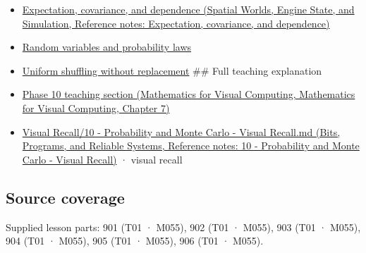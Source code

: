 \begin{itemize}
\item
  \href{../05-Spatial-Worlds-Engine-State-and-Simulation/main.pdf\#nameddest=appendix-54c383df9992}{Expectation, covariance, and dependence (Spatial Worlds, Engine State, and Simulation, Reference notes: Expectation, covariance, and dependence)}
\item
  \hyperref[appendix-4d0203f7944f]{Random variables and probability laws}
\item
  \hyperref[appendix-184fcc411663]{Uniform shuffling without replacement} \#\# Full teaching explanation
\item
  \href{../02-Mathematics-for-Visual-Computing/main.pdf\#nameddest=02-foundations-ii-ch023-a-probability-model-begins-with-possible-outcomes}{Phase 10 teaching section (Mathematics for Visual Computing, Mathematics for Visual Computing, Chapter 7)}
\item
  \href{../01-Bits-Programs-and-Reliable-Systems/main.pdf\#nameddest=appendix-cb5af353ef77}{Visual Recall/10 - Probability and Monte Carlo - Visual Recall.md (Bits, Programs, and Reliable Systems, Reference notes: 10 - Probability and Monte Carlo - Visual Recall)} · visual recall
\end{itemize}

\subsection{Source coverage}\label{appendix-f1ef323f6ed7-source-coverage}

Supplied lesson parts: 901 (T01 · M055), 902 (T01 · M055), 903 (T01 · M055), 904 (T01 · M055), 905 (T01 · M055), 906 (T01 · M055).
